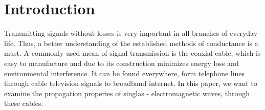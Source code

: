 \documentclass[a4paper,10pt,twocolumn]{article}
\begin{document}
    \section{Introduction}
    Transmitting signals without losses is very important in all branches of everyday life.
    Thus, a better understanding of the established methods of conductance is a must.
    A commonly used mean of signal transmission is the coaxial cable, which is easy to manufacture and due to its construction minimizes energy loss and environmental interference.
    It can be found everywhere, form telephone lines through cable television signals to broadband internet.
    In this paper, we want to examine the propagation properies of singlas - electromagnetic waves, through these cables.
\end{document}
